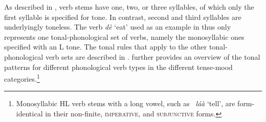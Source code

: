As described in , verb stems have one, two, or three syllables, of which only the first syllable is specified for tone. In contrast, second and third syllables are underlyingly toneless. The verb {\itshape dè} `eat' used as an example in  thus only represents one tonal-phonological set of verbs, namely the monosyllabic ones specified with an L tone.  The tonal rules that apply to the other tonal-phonological verb sets are described in .  further provides an overview of the tonal patterns for different phonological verb types in the different tense-mood categories.\footnote{Monosyllabic HL verb stems with a long vowel, such as \ {\itshape láà} `tell', are form-identical in their non-finite, \textsc{imperative}, and \textsc{subjunctive} forms.}



\begin{table}
\caption{Verb tone patterns in different TM categories by phonological verb set}
\label{Tab:TM-verbs}
\end{table} 

